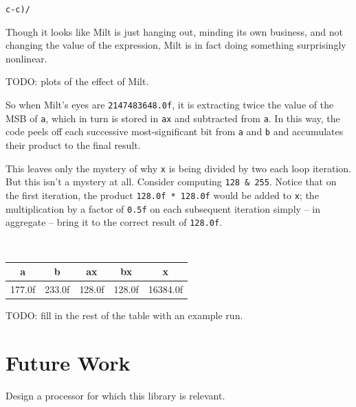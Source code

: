 \documentclass{acmsiggraph}
\theoremstyle{remark}
\theoremstyle{definition}
\begin{document}
\begin{center}
\huge
{\tt c-c)/}
\end{center}

Though it looks like Milt is just hanging out, minding its own business, and not changing the value of the expression,
Milt is in fact doing something surprisingly nonlinear.

TODO: plots of the effect of Milt.

So when Milt's eyes are {\tt 2147483648.0f}, it is extracting twice the value of the MSB of {\tt a},
which in turn is stored in {\tt ax} and subtracted from {\tt a}.
In this way, the code peels off each successive most-significant bit from {\tt a} and {\tt b} and accumulates their product to the final result.

This leaves only the mystery of why {\tt x} is being divided by two each loop iteration.
But this isn't a mystery at all.
Consider computing {\tt 128 \& 255}.
Notice that on the first iteration, the product {\tt 128.0f * 128.0f} would be added to {\tt x};
the multiplication by a factor of {\tt 0.5f} on each subsequent iteration simply -- in aggregate -- bring it to the correct result of {\tt 128.0f}.

{ \tt
\begin{tabular}{r|r|r|r|r}
\multicolumn{1}{c|}{a} &
\multicolumn{1}{c|}{b} &
\multicolumn{1}{c|}{ax} &
\multicolumn{1}{c|}{bx} &
\multicolumn{1}{c}{x} \\\hline
177.0f & 233.0f & 128.0f & 128.0f & 16384.0f \\
\end{tabular}
}

TODO: fill in the rest of the table with an example run.

\section{Future Work}

Design a processor for which this library is relevant.
\end{document}
